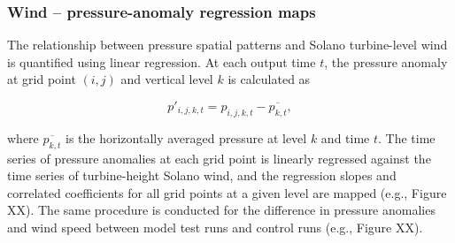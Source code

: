 \subsubsection{Wind -- pressure-anomaly regression maps}

The relationship between pressure spatial patterns and Solano turbine-level wind is quantified using linear regression.  At each output time $t$, the pressure anomaly at grid point $(i,j)$ and vertical level $k$ is calculated as

\begin{equation}
p'_{i,j,k,t} = p_{i,j,k,t} - \overline{p_{k,t}},
\end{equation}

where $\overline{p_{k,t}}$ is the horizontally averaged pressure at level $k$ and time $t$.  The time series of pressure anomalies at each grid point is linearly regressed against the time series of turbine-height Solano wind, and the regression slopes and correlated coefficients for all grid points at a given level are mapped (e.g., Figure XX).  The same procedure is conducted for the difference in pressure anomalies and wind speed between model test runs and control runs (e.g., Figure XX).

%